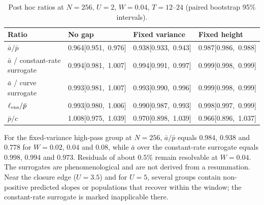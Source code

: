 \documentclass[12pt,a4paper]{article}
\theoremstyle{remark}
\begin{document}
\begin{table}[htbp]
\centering
\caption{Post hoc ratios at $N=256$, $U=2$, $W=0.04$, $T=12$--$24$ (paired bootstrap 95\% intervals).}
\label{tab:posthoc}
\begin{tabular}{@{}L{0.26\textwidth}C{0.21\textwidth}C{0.21\textwidth}C{0.21\textwidth}@{}}
\toprule
Ratio & No gap & Fixed variance & Fixed height\\
\midrule
$\bar a/\bar p$ & 0.964\newline\mbox{[0.951, 0.976]} & 0.938\newline\mbox{[0.933, 0.943]} & 0.987\newline\mbox{[0.986, 0.988]}\\
$\bar a$ / constant-rate surrogate & 0.994\newline\mbox{[0.981, 1.007]} & 0.994\newline\mbox{[0.991, 0.997]} & 0.999\newline\mbox{[0.998, 0.999]}\\
$\bar a$ / curve surrogate & 0.993\newline\mbox{[0.981, 1.007]} & 0.993\newline\mbox{[0.990, 0.996]} & 0.999\newline\mbox{[0.998, 0.999]}\\
$\ell_{\rm ens}/\bar p$ & 0.993\newline\mbox{[0.980, 1.006]} & 0.990\newline\mbox{[0.987, 0.993]} & 0.998\newline\mbox{[0.997, 0.999]}\\
$\bar p/c$ & 1.008\newline\mbox{[0.975, 1.039]} & 0.970\newline\mbox{[0.898, 1.039]} & 0.966\newline\mbox{[0.896, 1.037]}\\
\bottomrule
\end{tabular}
\end{table}

For the fixed-variance high-pass group at $N=256$, $\bar a/\bar p$ equals $0.984$, $0.938$ and $0.778$ for $W=0.02$, $0.04$ and $0.08$, while $\bar a$ over the constant-rate surrogate equals $0.998$, $0.994$ and $0.973$. Residuals of about $0.5\%$ remain resolvable at $W=0.04$. The surrogates are phenomenological and are not derived from a resummation. Near the closure edge ($U=3.5$) and for $U=5$, several groups contain non-positive predicted slopes or populations that recover within the window; the constant-rate surrogate is marked inapplicable there.
\end{document}
